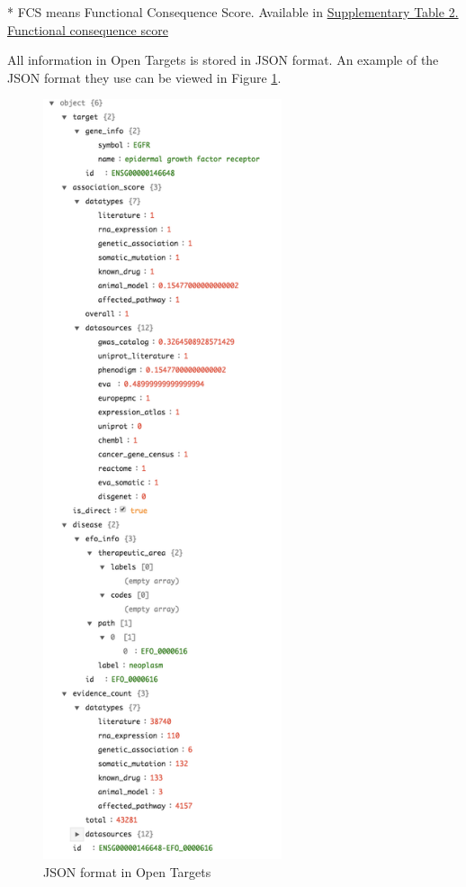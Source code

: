 * FCS means Functional Consequence Score. Available in \href{https://goo.gl/gkvHxK}{Supplementary Table 2. Functional consequence score}

All information in Open Targets is stored in JSON format. An example of the JSON format they use can be viewed in Figure \ref{fig:ot_json}.

\begin{figure}[H]
    \centering
    \includegraphics[width=7cm]{pics/ot_json.png}
    \caption{JSON format in Open Targets \label{fig:ot_json}}
\end{figure}

